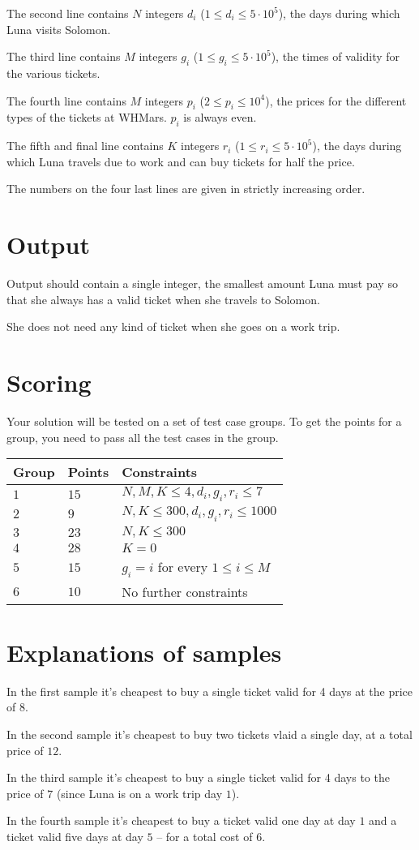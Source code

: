 The second line contains $N$ integers $d_i$ ($1 \leq d_i \leq 5\cdot10^5$), the days during which Luna visits Solomon.

The third line contains $M$ integers $g_i$ ($1 \leq g_i \leq 5\cdot10^5$), the times of validity for the various tickets.

The fourth line contains $M$ integers $p_i$ ($2 \leq p_i \leq 10^4$), the prices for the different types of the tickets at WHMars. $p_i$ is always even.

The fifth and final line contains $K$ integers $r_i$ ($1 \leq r_i \leq 5\cdot10^5$), the days during which Luna travels due to work and can buy tickets for half the price.

The numbers on the four last lines are given in strictly increasing order.

\section*{Output}
Output should contain a single integer, the smallest amount Luna must pay so that she always has a valid ticket when she travels to Solomon.

She does not need any kind of ticket when she goes on a work trip.

\section*{Scoring}
Your solution will be tested on a set of test case groups.
To get the points for a group, you need to pass all the test cases in the group.

\noindent
\begin{tabular}{| l | l | l |}
\hline
Group & Points & Constraints \\ \hline
$1$    & $15$         & $N, M, K\leq 4, d_i,g_i,r_i\leq 7$ \\ \hline
$2$    & $9$         & $N, K\leq 300, d_i,g_i,r_i\leq 1000$ \\ \hline
$3$    & $23$         & $N, K\leq 300$ \\ \hline
$4$    & $28$         & $K=0$ \\ \hline
$5$    & $15$         & $g_i=i$ for every $1\leq i\leq M$ \\ \hline
$6$    & $10$         & No further constraints  \\ \hline
\end{tabular}

\section*{Explanations of samples}
In the first sample it's cheapest to buy a single ticket valid for 4 days at the price of $8$.

In the second sample it's cheapest to buy two tickets vlaid a single day, at a total price of $12$.

In the third sample it's cheapest to buy a single ticket valid for 4 days to the price of $7$ (since Luna is on a work trip day $1$).

In the fourth sample it's cheapest to buy a ticket valid one day at day $1$ and a ticket valid five days at day $5$ -- for a total cost of $6$.
